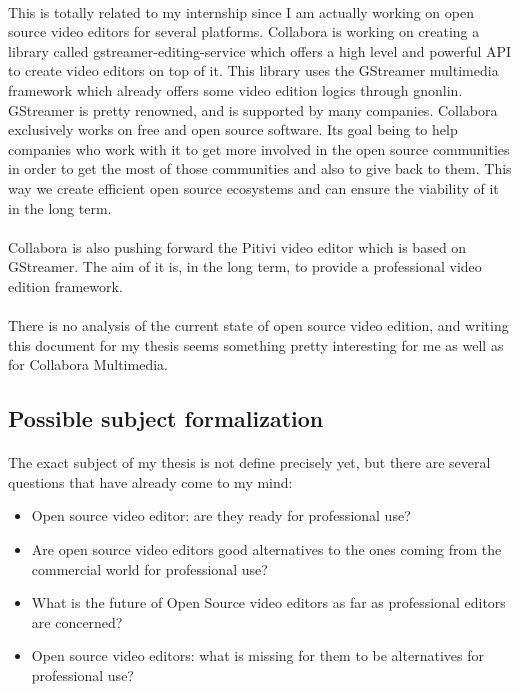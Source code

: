   \paragraph{}
    This is totally related to my internship since I am actually working on
    open source video editors for several platforms. Collabora is working
    on creating a library called gstreamer-editing-service which offers a
    high level and powerful API to create video editors on top of it. This
    library uses the GStreamer multimedia framework which already offers
    some video edition logics through gnonlin. GStreamer is pretty renowned,
    and is supported by many companies. Collabora exclusively works
    on free and open source software. Its goal being to help companies
    who work with it to get more involved in the open source communities in
    order to get the most of those communities and also to give back to them.
    This way we create efficient open source ecosystems and can ensure the viability
    of it in the long term.

  \paragraph{}
    Collabora is also pushing forward the Pitivi video editor which is
    based on GStreamer. The aim of it is, in the long term, to provide a
    professional video edition framework.

  \paragraph{}
    There is no analysis of the current state of open source video edition, and
    writing this document for my thesis seems something pretty interesting
    for me as well as for Collabora Multimedia.

\subsection{Possible subject formalization}
  \paragraph{}
    The exact subject of my thesis is not define precisely yet, but there are several
    questions that have already come to my mind:
    \begin{itemize}
      \item {Open source video editor: are they ready for professional use?}
      \item {Are open source video editors good alternatives to the ones
             coming from the commercial world for professional use?}
      \item {What is the future of Open Source video editors as far as
             professional editors are concerned?}
      \item {Open source video editors: what is missing for them to be
             alternatives for professional use?}
    \end{itemize}

